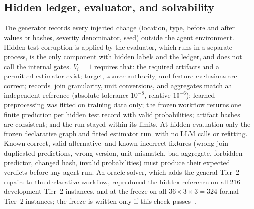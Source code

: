 \documentclass[conference]{IEEEtran}
\begin{document}
\subsection{Hidden ledger, evaluator, and solvability}
\label{sec:evaluator}
The generator records every injected change (location, type, before and after values or hashes, severity
denominator, seed) outside the agent environment. Hidden test corruption is applied by the evaluator, which runs in a
separate process, is the only component with hidden labels and the ledger, and does not call the internal gates.
$V_i=1$ requires that: the required artifacts and a permitted estimator exist; target, source authority, and feature
exclusions are correct; records, join granularity, unit conversions, and aggregates match an independent reference
(absolute tolerance $10^{-8}$, relative $10^{-6}$); learned preprocessing was fitted on training data only; the
frozen workflow returns one finite prediction per hidden test record with valid probabilities; artifact hashes are
consistent; and the run stayed within its limits. At hidden evaluation only the frozen declarative graph and fitted
estimator run, with no LLM calls or refitting. Known-correct, valid-alternative, and known-incorrect fixtures (wrong
join, duplicated predictions, wrong version, unit mismatch, bad aggregate, forbidden predictor, changed hash,
invalid probabilities) must produce their expected verdicts before any agent run. An oracle solver, which adds the
general Tier~2 repairs to the declarative workflow, reproduced the hidden reference on all 216 development Tier~2
instances, and at the freeze on all $36\times3\times3=324$ formal Tier~2 instances; the freeze is written only if
this check passes~\cite{zhu2025abc}.

\end{document}
